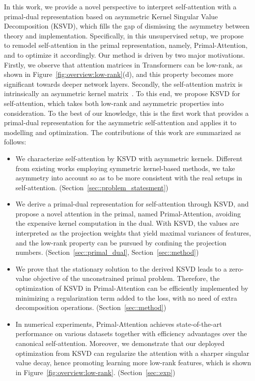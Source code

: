\documentclass{article}
\begin{document}
	
	In this work, we provide a novel perspective to interpret self-attention with a primal-dual representation based on asymmetric Kernel Singular Value Decomposition (KSVD), which fills
	the gap of dismissing the asymmetry between theory and implementation. 
	{Specifically, in this unsupervised setup, we propose to remodel self-attention in the primal representation, namely, Primal-Attention, and to optimize it accordingly.}
	{Our method is driven by two major motivations.}
	{Firstly, 
		we observe that attention matrices in Transformers can be
		low-rank, as shown in Figure~\ref{fig:overview:low-rank}(d), and this property becomes more significant towards deeper network layers.}
	{Secondly, the self-attention matrix is intrinsically an asymmetric kernel matrix~\cite{tsai2019,wright2021transformers}.}
	To this end, we propose KSVD for self-attention, which takes both low-rank and asymmetric properties into consideration. 
	To the best of our knowledge, this is the first work that provides a primal-dual representation for the asymmetric self-attention and applies it to modelling and optimization.
	The  contributions of this work are summarized as follows:
	\begin{itemize}
		\item We characterize self-attention by KSVD with asymmetric kernels. Different from existing works employing symmetric kernel-based methods, we take asymmetry into account so as to be more consistent with the real setups in self-attention. (Section~\ref{sec::problem_statesment})
		
		\item  We derive a primal-dual representation for self-attention {through KSVD}, and {propose} a novel attention in the primal, named Primal-Attention, avoiding the expensive kernel computation in the dual.
		With KSVD, the values are interpreted as the projection weights that yield maximal variances of features, and  the low-rank property can be 
		pursued by confining the projection numbers. 
		(Section~\ref{sec::primal_dual}, Section~\ref{sec::method})
		
		\item  We prove that the stationary solution to the derived KSVD leads to a zero-value objective 
		of the unconstrained primal problem.
		Therefore, the optimization of KSVD in Primal-Attention can be efficiently implemented by minimizing a regularization term added to the loss, with no need of extra decomposition operations. 
		(Section~\ref{sec::method})
		
		
		\item In numerical experiments, Primal-Attention achieves state-of-the-art performance on various datasets together with efficiency advantages over the canonical self-attention. 
		Moreover, we demonstrate that our deployed optimization from KSVD can regularize the attention with a sharper singular value decay, hence promoting learning more low-rank features, which is shown in Figure~\ref{fig:overview:low-rank}. (Section~\ref{sec::exp})
		
		
	\end{itemize}
	
\end{document}
